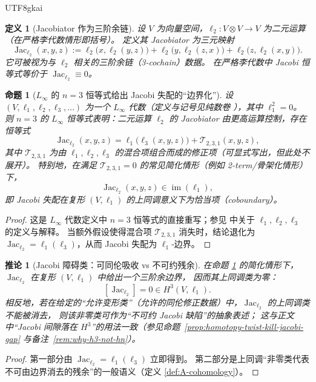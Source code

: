 \documentclass[12pt]{article}
\newtheorem{definition}{定义}[section]
\newtheorem{proposition}{命题}[section]
\newtheorem{corollary}{推论}[section]
\begin{document}
\begin{CJK*}{UTF8}{gkai}
\begin{definition}[Jacobiator 作为三阶余链]\label{def:A-jacobiator-3cochain}
设 $V$ 为向量空间，$\ell_2:V\otimes V\to V$ 为二元运算（在严格李代数情形即括号）。
定义其 Jacobiator 为三元映射
\[
  \operatorname{Jac}_{\ell_2}(x,y,z)
  :=
  \ell_2\bigl(x,\ell_2(y,z)\bigr)
  +\ell_2\bigl(y,\ell_2(z,x)\bigr)
  +\ell_2\bigl(z,\ell_2(x,y)\bigr).
\]
它可被视为与 $\ell_2$ 相关的三阶余链（3-cochain）数据。
在严格李代数中 Jacobi 恒等式等价于 $\operatorname{Jac}_{\ell_2}\equiv0$。
\end{definition}

\begin{proposition}[$L_\infty$ 的 $n=3$ 恒等式给出 Jacobi 失配的“边界化”]\label{prop:A-linfty-jacobi-boundary}
设 $(V,\ell_1,\ell_2,\ell_3,\dots)$ 为一个 $L_\infty$ 代数（定义与记号见纯数卷 \cite{GaoZheng2025GFramework}），其中 $\ell_1^2=0$。
则 $n=3$ 的 $L_\infty$ 恒等式表明：二元运算 $\ell_2$ 的 Jacobiator 由更高运算控制，存在恒等式
\[
  \operatorname{Jac}_{\ell_2}(x,y,z)
  =
  \ell_1\bigl(\ell_3(x,y,z)\bigr)
  + \mathcal{T}_{2,3,1}(x,y,z),
\]
其中 $\mathcal{T}_{2,3,1}$ 为由 $\ell_1,\ell_2,\ell_3$ 的混合项组合而成的修正项（可显式写出，但此处不展开）。
特别地，在满足 $\mathcal{T}_{2,3,1}=0$ 的常见简化情形（例如 2-term/骨架化情形）下，
\[
  \operatorname{Jac}_{\ell_2}(x,y,z)\in \operatorname{im}(\ell_1),
\]
即 Jacobi 失配在复形 $(V,\ell_1)$ 的上同调意义下为恰当项（coboundary）。
\end{proposition}
\begin{proof}
这是 $L_\infty$ 代数定义中 $n=3$ 恒等式的直接重写；参见 \cite{GaoZheng2025GFramework} 中关于 $\ell_1,\ell_2,\ell_3$ 的定义与解释。
当额外假设使得混合项 $\mathcal{T}_{2,3,1}$ 消失时，结论退化为
$\operatorname{Jac}_{\ell_2}=\ell_1(\ell_3)$，从而 Jacobi 失配为 $\ell_1$-边界。
\end{proof}

\begin{corollary}[Jacobi 障碍类：可同伦吸收 vs 不可约残余]\label{cor:A-jacobi-obstruction}
在命题 \ref{prop:A-linfty-jacobi-boundary} 的简化情形下，
$\operatorname{Jac}_{\ell_2}$ 在复形 $(V,\ell_1)$ 中给出一个三阶余边界，
因而其上同调类为零：
\[
  [\operatorname{Jac}_{\ell_2}]=0\in H^3(V,\ell_1).
\]
相反地，若在给定的“允许变形类”（允许的同伦修正数据）中，$\operatorname{Jac}_{\ell_2}$ 的上同调类不能被消去，
则该非零类可作为“不可约 Jacobi 缺陷”的抽象表述；
这与正文中“Jacobi 间隙落在 $H^3$”的用法一致（参见命题~\ref{prop:homotopy-twist-kill-jacobi-gap} 与备注~\ref{rem:why-h3-not-hn}）。
\end{corollary}
\begin{proof}
第一部分由 $\operatorname{Jac}_{\ell_2}=\ell_1(\ell_3)$ 立即得到。
第二部分是上同调“非零类代表不可由边界消去的残余”的一般语义（定义 \ref{def:A-cohomology}）。
\end{proof}


\end{CJK*}
\end{document}
